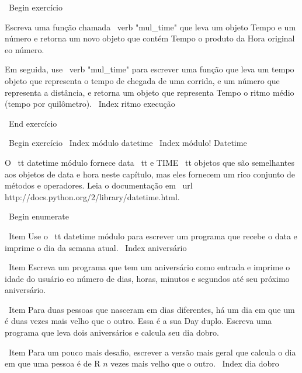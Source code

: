 \documentclass[10pt]{book}
\begin{document}
{{{{{{{{{{{{{{\ Begin {} exercício

Escreva uma função chamada \ verb "mul_time" que leva um objeto Tempo
e um número e retorna um novo objeto que contém Tempo
o produto da Hora original eo número.

Em seguida, use \ verb "mul_time" para escrever uma função que leva um tempo
objeto que representa o tempo de chegada de uma corrida, e um número
que representa a distância, e retorna um objeto que representa Tempo
o ritmo médio (tempo por quilômetro).
\ Index {ritmo execução}

\ End {} exercício





\ Begin {} exercício
\ Index {módulo datetime}
\ Index {módulo! Datetime}

O {\ tt datetime} módulo fornece {data \ tt} e {TIME \ tt} objetos
que são semelhantes aos objetos de data e hora neste capítulo, mas
eles fornecem um rico conjunto de métodos e operadores. Leia o
documentação em \ url {http://docs.python.org/2/library/datetime.html}.

\ Begin {enumerate}

\ Item Use o {\ tt datetime} módulo para escrever um programa que recebe o
  data e imprime o dia da semana atual.
\ Index {aniversário}

\ Item Escreva um programa que tem um aniversário como entrada e imprime o
  idade do usuário eo número de dias, horas, minutos e segundos até
  seu próximo aniversário.

\ Item Para duas pessoas que nasceram em dias diferentes, há um dia em que um
  é duas vezes mais velho que o outro. Essa é a sua Day duplo. Escreva uma
  programa que leva dois aniversários e calcula seu dia dobro.

\ Item Para um pouco mais desafio, escrever a versão mais geral que
  calcula o dia em que uma pessoa é de R $ n $ vezes mais velho que o outro.
\ Index {dia dobro}

}}}}}}}}}}}}}}
\end{document}
